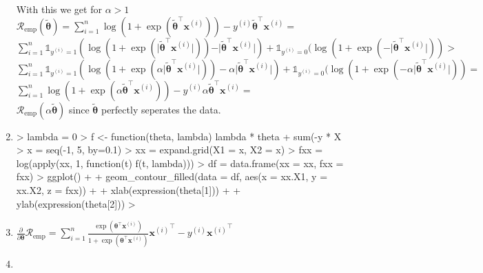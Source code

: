 \begin{enumerate}
With this we get for $\alpha > 1$ \\
$\mathcal{R}_\text{emp}(\tilde{\bm{\theta}}) = \sum^n_{i=1} \log(1 + \exp(\tilde{\bm{\theta}}^\top \mathbf{x}^{(i)})) - y^{(i)}\tilde{\bm{\theta}}^\top \mathbf{x}^{(i)} =$\\
$\sum^n_{i=1} \mathds{1}_{y^{(i)} = 1} (\log(1 + \exp(\vert\tilde{\bm{\theta}}^\top \mathbf{x}^{(i)}\vert)) - \vert\tilde{\bm{\theta}}^\top \mathbf{x}^{(i)}\vert) + \mathds{1}_{y^{(i)} = 0} (\log(1 + \exp(-\vert\tilde{\bm{\theta}}^\top \mathbf{x}^{(i)}\vert)) > $ \\
$\sum^n_{i=1} \mathds{1}_{y^{(i)} = 1} (\log(1 + \exp(\alpha\vert\tilde{\bm{\theta}}^\top \mathbf{x}^{(i)}\vert)) - \alpha\vert\tilde{\bm{\theta}}^\top \mathbf{x}^{(i)}\vert) + \mathds{1}_{y^{(i)} = 0} (\log(1 + \exp(-\alpha\vert\tilde{\bm{\theta}}^\top \mathbf{x}^{(i)}\vert)) = $ \\
$\sum^n_{i=1} \log(1 + \exp(\alpha\tilde{\bm{\theta}}^\top \mathbf{x}^{(i)})) - y^{(i)}\alpha\tilde{\bm{\theta}}^\top \mathbf{x}^{(i)} =$\\
$\mathcal{R}_\text{emp}(\alpha\tilde{\bm{\theta}})$ 
since $\tilde{\bm{\theta}}$ perfectly seperates the data.

\item
\begin{Schunk}
\begin{Sinput}
> lambda = 0
> f <- function(theta, lambda) lambda * theta %*% theta + 
+   sum(-y * X %*% theta + log(1 + exp(X %*% theta)))
> x = seq(-1, 5, by=0.1)
> xx = expand.grid(X1 = x, X2 = x)
> fxx = log(apply(xx, 1, function(t) f(t, lambda)))
> df = data.frame(xx = xx, fxx = fxx)
> ggplot() +
+     geom_contour_filled(data = df, aes(x = xx.X1, y = xx.X2, z = fxx)) +
+     xlab(expression(theta[1])) +
+     ylab(expression(theta[2])) 
> 
\end{Sinput}
\end{Schunk}

\item $\frac{\partial}{\partial \bm{\theta}}\mathcal{R}_{\text{emp}} = \sum^n_{i=1} \frac{\exp(\bm{\theta}^\top \mathbf{x}^{(i)})}{1 + \exp(\bm{\theta}^\top \mathbf{x}^{(i)})}{\mathbf{x}^{(i)}}^\top - y^{(i)}{\mathbf{x}^{(i)}}^\top$ 
\item 


\end{enumerate}
